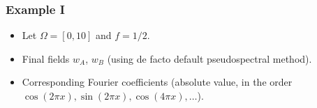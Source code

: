 \begin{frame}[t]
    \frametitle{Example I}

    \begin{itemize}
        \item Let $\Omega = [0, 10]$ and $f = 1/2$.
        \item<2-> Final fields $w_A$, $w_B$ (using de facto default pseudospectral method).
        \item<3-> Corresponding Fourier coefficients (absolute value, in the order $\cos(2 \pi x), \sin(2 \pi x), \cos(4 \pi x), \dots$).
    \end{itemize}

    \begin{columns}
    \begin{column}{0.5\textwidth}
    \end{column}
    \begin{column}{0.5\textwidth}

\end{column}
\end{columns}
\end{frame}
